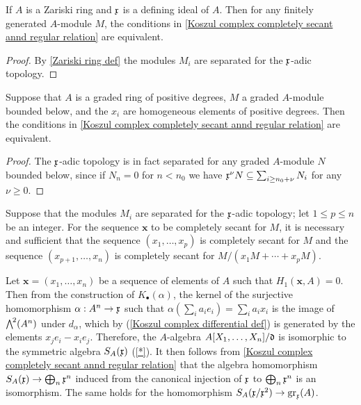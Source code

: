 \begin{corollary}\label{Koszul sequence Zariski ring complete secant is regular}
If $A$ is a Zariski ring and $\mathfrak{x}$ is a defining ideal of $A$. Then for any finitely generated $A$-module $M$, the conditions in \cref{Koszul complex completely secant annd regular relation} are equivalent.
\end{corollary}
\begin{proof}
By \cref{Zariski ring def} the modules $M_i$ are separated for the $\mathfrak{x}$-adic topology.
\end{proof}
\begin{corollary}\label{Koszul sequence graded ring complete secant is regular}
Suppose that $A$ is a graded ring of positive degrees, $M$ a graded $A$-module bounded below, and the $x_i$ are homogeneous elements of positive degrees. Then the conditions in \cref{Koszul complex completely secant annd regular relation} are equivalent.
\end{corollary}
\begin{proof}
The $\mathfrak{x}$-adic topology is in fact separated for any graded $A$-module $N$ bounded below, since if $N_n=0$ for $n<n_0$ we have $\mathfrak{x}^\nu N\subseteq\sum_{i\geq n_0+\nu}N_i$ for any $\nu\geq 0$.
\end{proof}
\begin{corollary}\label{Koszul sequence complete secant truncation}
Suppose that the modules $M_i$ are separated for the $\mathfrak{x}$-adic topology; let $1\leq p\leq n$ be an integer. For the sequence $\bm{x}$ to be completely secant for $M$, it is necessary and sufficient that the sequence $(x_1,\dots,x_p)$ is completely secant for $M$ and the sequence $(x_{p+1},\dots,x_n)$ is completely secant for $M/(x_1M+\cdots+x_pM)$.
\end{corollary}
\begin{remark}
Let $\bm{x}=(x_1,\dots,x_n)$ be a sequence of elements of $A$ such that $H_1(\bm{x},A)=0$. Then from the construction of $K_\bullet(\alpha)$, the kernel of the surjective homomorphism $\alpha:A^n\to\mathfrak{x}$ such that $\alpha(\sum_ia_ie_i)=\sum_ia_ix_i$ is the image of $\bigw^2(A^n)$ under $d_\alpha$, which by (\ref{Koszul complex differential def}) is generated by the elements $x_je_i-x_ie_j$. Therefore, the $A$-algebra $A[X_1,\dots,X_n]/\mathfrak{d}$ is isomorphic to the symmetric algebra $S_A(\mathfrak{x})$ (\cref{*}). It then follows from \cref{Koszul complex completely secant annd regular relation} that the algebra homomorphism $S_A(\mathfrak{x})\to\bigoplus_n\mathfrak{x}^n$ induced from the canonical injection of $\mathfrak{x}$ to $\bigoplus_n\mathfrak{x}^n$ is an isomorphism. The same holds for the homomorphism $S_A(\mathfrak{x}/\mathfrak{x}^2)\to\mathrm{gr}_{\mathfrak{x}}(A)$. 
\end{remark}
